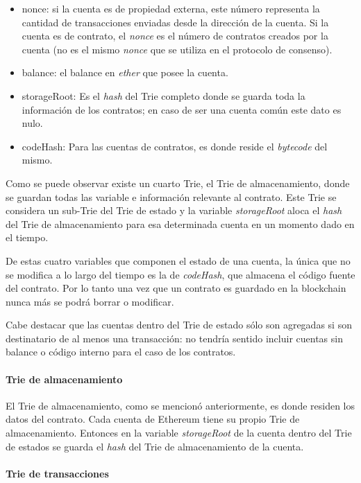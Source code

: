 \begin{itemize}
  \item nonce: si la cuenta es de propiedad externa, este número representa la cantidad de transacciones enviadas desde la dirección de la cuenta. Si la cuenta es de contrato, el \textit{nonce} es el número de contratos creados por la cuenta (no es el mismo \textit{nonce} que se utiliza en el protocolo de consenso).
  \item balance: el balance en \textit{ether} que posee la cuenta.
  \item storageRoot: Es el \textit{hash} del Trie completo donde se guarda toda la información de los contratos; en caso de ser una cuenta común este dato es nulo.
  \item codeHash: Para las cuentas de contratos, es donde reside el \textit{bytecode} del mismo.
\end{itemize}

Como se puede observar existe un cuarto Trie, el Trie de almacenamiento, donde se guardan todas las variable e información relevante al contrato.  Este Trie se considera un sub-Trie del Trie de estado y la variable \textit{storageRoot} aloca el \textit{hash} del Trie de almacenamiento para esa determinada cuenta en un momento dado en el tiempo.

De estas cuatro variables que componen el estado de una cuenta, la única que no se modifica a lo largo del tiempo es la de \textit{codeHash}, que almacena el código fuente del contrato. Por lo tanto una vez que un contrato es guardado en la blockchain nunca más se podrá borrar o modificar.

Cabe destacar que las cuentas dentro del Trie de estado sólo son agregadas si son destinatario de al menos una transacción: no tendría sentido incluir cuentas sin balance o código interno para el caso de los contratos.

\paragraph{Trie de almacenamiento}
\label{bc_ethereum_storage_trie}

El Trie de almacenamiento, como se mencionó anteriormente, es donde residen los datos del contrato. Cada cuenta de Ethereum tiene su propio Trie de almacenamiento. Entonces en la variable \textit{storageRoot} de la cuenta dentro del Trie de estados se guarda el \textit{hash} del Trie de almacenamiento de la cuenta.

\paragraph{Trie de transacciones}

